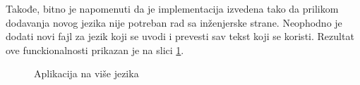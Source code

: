 \documentclass[12pt,oneside]{memoir}
\begin{document}
Takođe, bitno je napomenuti da je implementacija izvedena tako da prilikom dodavanja novog jezika nije potreban rad sa inženjerske strane. Neophodno je dodati novi fajl za jezik koji se uvodi i prevesti sav tekst koji se koristi. Rezultat ove funckionalnosti prikazan je na slici \ref{fig:multiLanguages}.

\begin{figure}
    \centering
    \qquad
    \caption{Aplikacija na više jezika}
    \label{fig:multiLanguages}
\end{figure}
\end{document}
